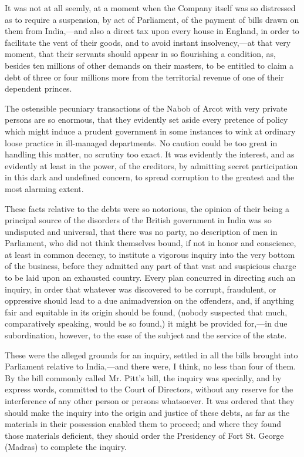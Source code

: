 It was not at all seemly, at a moment when the Company itself was so distressed as to require a suspension, by act of Parliament, of the payment of bills drawn on them from India,—and also a direct tax upon every house in England, in order to facilitate the vent of their goods, and to avoid instant insolvency,—at that very moment, that their servants should appear in so flourishing a condition, as, besides ten millions of other demands on their masters, to be entitled to claim a debt of three or four millions more from the territorial revenue of one of their dependent princes.

The ostensible pecuniary transactions of the Nabob of Arcot with very private persons are so enormous, that they evidently set aside every pretence of policy which might induce a prudent government in some instances to wink at ordinary loose practice in ill-managed departments. No caution could be too great in handling this matter, no scrutiny too exact. It was evidently the interest, and as evidently at least in the power, of the creditors, by admitting secret participation in this dark and undefined concern, to spread corruption to the greatest and the most alarming extent.

These facts relative to the debts were so notorious, the opinion of their being a principal source of the disorders of the British government in India was so undisputed and universal, that there was no party, no description of men in Parliament, who did not think themselves bound, if not in honor and conscience, at least in common decency, to institute a vigorous inquiry into the very bottom of the business, before they admitted any part of that vast and suspicious charge to be laid upon an exhausted country. Every plan concurred in directing such an inquiry, in order that whatever was discovered to be corrupt, fraudulent, or oppressive should lead to a due animadversion on the offenders, and, if anything fair and equitable in its origin should be found, (nobody suspected that much, comparatively speaking, would be so found,) it might be provided for,—in due subordination, however, to the ease of the subject and the service of the state.

These were the alleged grounds for an inquiry, settled in all the bills brought into Parliament relative to India,—and there were, I think, no less than four of them. By the bill commonly called Mr. Pitt's bill, the inquiry was specially, and by express words, committed to the Court of Directors, without any reserve for the interference of any other person or persons whatsoever. It was ordered that they should make the inquiry into the origin and justice of these debts, as far as the materials in their possession enabled them to proceed; and where they found those materials deficient, they should order the Presidency of Fort St. George (Madras) to complete the inquiry.

